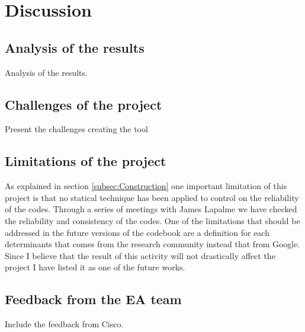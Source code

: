 
\chapter{Discussion} %

\label{Chapter6} %



\section{Analysis of the results}
Analysis of the results.

\section{Challenges of the project}
Present the challenges creating the tool

\section{Limitations of the project}
As explained in section \ref{subsec:Construction} one important limitation of this project is that no statical technique has been applied to control on the reliability of the codes. Through a series of meetings with James Lapalme we have checked the reliability and consistency of the codes.
One of the limitations that should be addressed in the future versions of the codebook are a definition for each determinants that comes from the research community instead that from Google. Since I believe that the result of this activity will not drastically affect the project I have listed it as one of the future works.
\section{Feedback from the EA team}
Include the feedback from Cisco.

